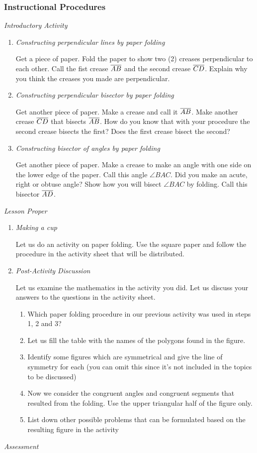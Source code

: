 \subsubsection*{Instructional Procedures}
\textit{Introductory Activity}
\begin{enumerate}
\item \textit{Constructing perpendicular lines by paper folding}

Get a piece of paper. Fold the paper to show two (2) creases perpendicular to each other. Call
the fist crease $\overline{AB}$ and the second crease $\overline{CD}$. Explain why you think the creases you made are perpendicular.
\item \textit{Constructing perpendicular bisector by paper folding}

Get another piece of paper. Make a crease and call it $\overline{AB}$. Make another crease $\overline{CD}$ that bisects $\overline{AB}$. How do you know that with your procedure the second crease bisects the first? Does the
first crease bisect the second?

\item \textit{Constructing bisector of angles by paper folding}

Get another piece of paper. Make a crease to make an angle with one side on the lower edge of
the paper. Call this angle $\angle BAC$. Did you make an acute, right or obtuse angle? Show how you
will bisect $\angle BAC$ by folding. Call this bisector $\overline{AD}$.
\end{enumerate}
\textit{Lesson Proper}
\begin{enumerate}
\item \textit{Making a cup}

Let us do an activity on paper folding. Use the square paper and follow the procedure in the
activity sheet that will be distributed.
\item \textit{Post-Activity Discussion}

Let us examine the mathematics in the activity you did. Let us discuss your answers to the
questions in the activity sheet.
	\begin{enumerate}
	\item Which paper folding procedure in our previous activity was used in steps 1, 2 and 3?
	\item Let us fill the table with the names of the polygons found in the figure.
	\item Identify some figures which are symmetrical and give the line of symmetry for each (you can
	omit this since it's not included in the topics to be discussed)
	\item Now we consider the congruent angles and congruent segments that resulted from the
	folding. Use the upper triangular half of the figure only.
	\item List down other possible problems that can be formulated based on the resulting figure in
	the activity
	\end{enumerate}
\end{enumerate}
\textit{Assessment}

